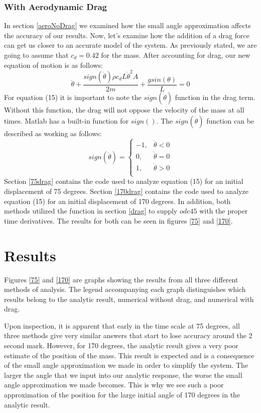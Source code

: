\documentclass{article}
\begin{document}
\subsubsection{With Aerodynamic Drag}
In section \ref{aeroNoDrag} we examined how the small angle approximation affects the accuracy of our results. Now, let's examine how the addition of a drag force can get us closer to an accurate model of the system. As previously stated, we are going to assume that $c_d = 0.42$ for the mass. After accounting for drag, our new equation of motion is as follows:
\begin{equation}
\boxed{\ddot{\theta} + \frac{sign(\dot{\theta})\rho c_d L \dot{\theta}^2 A}{2m}+\frac{gsin(\theta)}{L}=0}
\end{equation}
For equation (15) it is important to note the $sign(\dot{\theta})$ function in the drag term. Without this function, the drag will not oppose the velocity of the mass at all times. Matlab has a built-in function for $sign()$. The $sign(\dot{\theta})$ function can be described as working as follows:
\begin{equation}
sign(\dot{\theta}) =
\begin{cases}
-1, & \dot{\theta} < 0 \\
0, & \dot{\theta} = 0 \\
1, & \dot{\theta} > 0 \\
\end{cases}
\end{equation}
Section \ref{75drag} contains the code used to analyze equation (15) for an initial displacement of 75 degrees. Section \ref{170drag} contains the code used to analyze equation (15) for an initial displacement of 170 degrees. In addition, both methods utilized the function in section \ref{drag} to supply $ode45$ with the proper time derivatives. The results for both can be seen in figures \ref{75} and \ref{170}.

\section{Results}
Figures \ref{75} and \ref{170} are graphs showing the results from all three different methods of analysis. The legend accompanying each graph distinguishes which results belong to the analytic result, numerical without drag, and numerical with drag.

Upon inspection, it is apparent that early in the time scale at 75 degrees, all three methods give very similar answers that start to lose accuracy around the 2 second mark. However, for 170 degrees, the analytic result gives a very poor estimate of the position of the mass. This result is expected and is a consequence of the small angle approximation we made in order to simplify the system. The larger the angle that we input into our analytic response, the worse the small angle approximation we made becomes. This is why we see such a poor approximation of the position for the large initial angle of 170 degrees in the analytic result.
\end{document}
